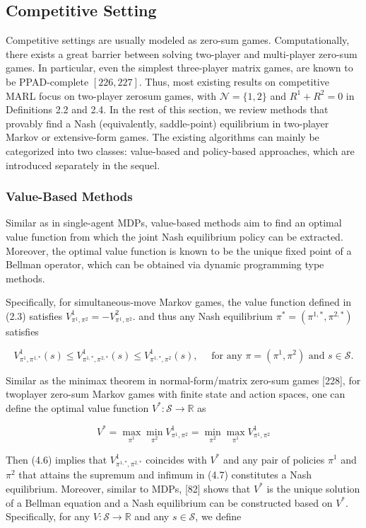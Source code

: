 \documentclass[10pt]{article}
\begin{document}
\subsection{Competitive Setting}
Competitive settings are usually modeled as zero-sum games. Computationally, there exists a great barrier between solving two-player and multi-player zero-sum games. In particular, even the simplest three-player matrix games, are known to be PPAD-complete $[226,227]$. Thus, most existing results on competitive MARL focus on two-player zerosum games, with $\mathcal{N}=\{1,2\}$ and $R^{1}+R^{2}=0$ in Definitions 2.2 and 2.4. In the rest of this section, we review methods that provably find a Nash (equivalently, saddle-point) equilibrium in two-player Markov or extensive-form games. The existing algorithms can mainly be categorized into two classes: value-based and policy-based approaches, which are introduced separately in the sequel.

\subsubsection{Value-Based Methods}
Similar as in single-agent MDPs, value-based methods aim to find an optimal value function from which the joint Nash equilibrium policy can be extracted. Moreover, the optimal value function is known to be the unique fixed point of a Bellman operator, which can be obtained via dynamic programming type methods.

Specifically, for simultaneous-move Markov games, the value function defined in (2.3) satisfies $V_{\pi^{1}, \pi^{2}}^{1}=-V_{\pi^{1}, \pi^{2}}^{2}$. and thus any Nash equilibrium $\pi^{*}=\left(\pi^{1, *}, \pi^{2, *}\right)$ satisfies

\[
V_{\pi^{1}, \pi^{1, *}}^{1}(s) \leq V_{\pi^{1, *}, \pi^{2, *}}^{1}(s) \leq V_{\pi^{1, *}, \pi^{2}}^{1}(s), \quad \text { for any } \pi=\left(\pi^{1}, \pi^{2}\right) \text { and } s \in \mathcal{S} .
\]

Similar as the minimax theorem in normal-form/matrix zero-sum games [228], for twoplayer zero-sum Markov games with finite state and action spaces, one can define the optimal value function $V^{*}: \mathcal{S} \rightarrow \mathbb{R}$ as

\[
V^{*}=\max _{\pi^{1}} \min _{\pi^{2}} V_{\pi^{1}, \pi^{2}}^{1}=\min _{\pi^{2}} \max _{\pi^{1}} V_{\pi^{1}, \pi^{2}}^{1}
\]

Then (4.6) implies that $V_{\pi^{1, *}, \pi^{2, *}}^{1}$ coincides with $V^{*}$ and any pair of policies $\pi^{1}$ and $\pi^{2}$ that attains the supremum and infimum in (4.7) constitutes a Nash equilibrium. Moreover, similar to MDPs, [82] shows that $V^{*}$ is the unique solution of a Bellman equation and a Nash equilibrium can be constructed based on $V^{*}$. Specifically, for any $V: \mathcal{S} \rightarrow \mathbb{R}$ and any $s \in \mathcal{S}$, we define
\end{document}
